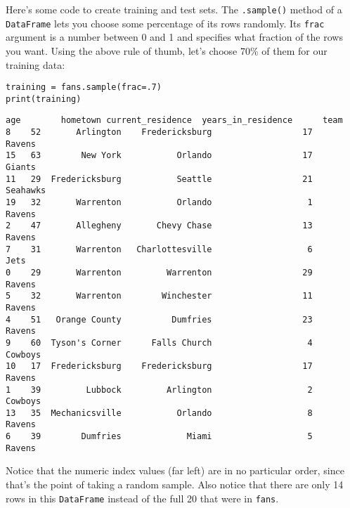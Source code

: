 \label{sampleRows}

Here's some code to create training and test sets. The \texttt{.sample()}
method of a \texttt{DataFrame} lets you choose some percentage of its rows 
randomly. Its \texttt{frac} argument is a number between 0 and 1 and specifies
what fraction of the rows you want. Using the above rule of thumb, let's choose
70\% of them for our training data:

\begin{Verbatim}[fontsize=\small,samepage=true,frame=single,framesep=3mm]
training = fans.sample(frac=.7)
print(training)
\end{Verbatim}
\vspace{-.2in}

\begin{Verbatim}[fontsize=\scriptsize,samepage=true,frame=leftline,framesep=5mm,framerule=1mm]
    age        hometown current_residence  years_in_residence      team
8    52       Arlington    Fredericksburg                  17    Ravens
15   63        New York           Orlando                  17    Giants
11   29  Fredericksburg           Seattle                  21  Seahawks
19   32       Warrenton           Orlando                   1    Ravens
2    47       Allegheny       Chevy Chase                  13    Ravens
7    31       Warrenton   Charlottesville                   6      Jets
0    29       Warrenton         Warrenton                  29    Ravens
5    32       Warrenton        Winchester                  11    Ravens
4    51   Orange County          Dumfries                  23    Ravens
9    60  Tyson's Corner      Falls Church                   4   Cowboys
10   17  Fredericksburg    Fredericksburg                  17    Ravens
1    39         Lubbock         Arlington                   2   Cowboys
13   35  Mechanicsville           Orlando                   8    Ravens
6    39        Dumfries             Miami                   5    Ravens
\end{Verbatim}

Notice that the numeric index values (far left) are in no particular order,
since that's the point of taking a random sample. Also notice that there are
only 14 rows in this \texttt{DataFrame} instead of the full 20 that were in
\texttt{fans}.


